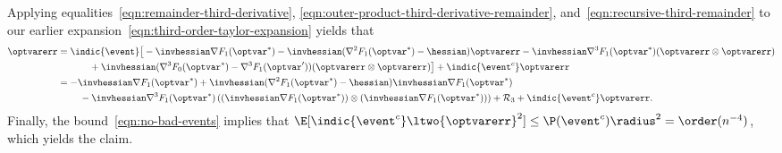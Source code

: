\documentclass[11pt,twoside]{article}
\def\jmlr{1}
\theoremstyle{definition}
\begin{document}
Applying equalities~\eqref{eqn:remainder-third-derivative},
\eqref{eqn:outer-product-third-derivative-remainder},
and~\eqref{eqn:recursive-third-remainder} to our earlier
expansion~\eqref{eqn:third-order-taylor-expansion} yields that
\begin{align*}
  \optvarerr & =
  \indic{\event}\big[
    -\invhessian \nabla F_1(\optvar^*)
    - \invhessian(\nabla^2 F_1(\optvar^*) - \hessian) \optvarerr
    - \invhessian \nabla^3 F_1(\optvar^*)(\optvarerr \otimes \optvarerr)
    \\
    & \qquad\quad ~
    + \invhessian (\nabla^3 F_0(\optvar^*) - \nabla^3 F_1(\optvar'))
    (\optvarerr \otimes \optvarerr)\big]
  + \indic{\event^c} \optvarerr
  \\
  & = -\invhessian \nabla F_1(\optvar^*)
  + \invhessian(\nabla^2 F_1(\optvar^*) - \hessian)
  \invhessian \nabla F_1(\optvar^*) \\
  & \qquad ~ - \invhessian \nabla^3 F_1(\optvar^*)\left(
  (\invhessian \nabla F_1(\optvar^*)) \otimes
  (\invhessian \nabla F_1(\optvar^*)) \right)
  + \remainder_3
  + \indic{\event^c} \optvarerr.
\end{align*}
Finally, the bound~\eqref{eqn:no-bad-events} implies that
$\E[\indic{\event^c}\ltwo{\optvarerr}^2] \le \P(\event^c) \radius^2 =
\order(n^{-4})$, which yields the claim.






\ifdefined\jmlr
\else

\fi



\end{document}
